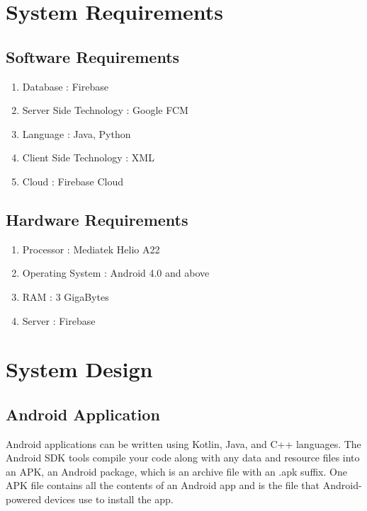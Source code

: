 \documentclass[14pt]{report}
\begin{document}

	\chapter{System Requirements}\label{chapter2}
		
	
	
		\section{Software Requirements}
					\begin{enumerate}
						\item Database : Firebase
						\item Server Side Technology : Google FCM
						\item Language : Java, Python
						\item Client Side Technology : XML
						\item Cloud : Firebase Cloud
					\end{enumerate}
		\section{Hardware Requirements}
					\begin{enumerate}
						\item Processor : Mediatek Helio A22
						\item Operating System : Android 4.0 and above
						\item RAM : 3 GigaBytes
						\item Server : Firebase 
					\end{enumerate}
	\newpage


	\chapter{System Design}\label{chapter3}
		
	

		\section{Android Application}
			Android applications can be written using Kotlin, Java, and C++ languages. The Android SDK tools compile your code along with any data and resource files into an APK, an Android package, which is an archive file with an .apk suffix. One APK file contains all the contents of an Android app and is the file that Android-powered devices use to install the app.\\
\end{document}
